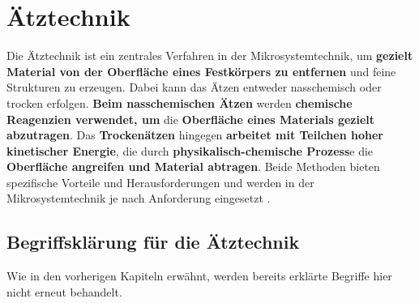 \documentclass{article} %
\begin{document}
\clearpage
\section{Ätztechnik}

Die Ätztechnik ist ein zentrales Verfahren in der Mikrosystemtechnik, um \textbf{gezielt Material von der Oberfläche eines Festkörpers zu entfernen} und feine Strukturen zu erzeugen. Dabei kann das Ätzen entweder nasschemisch oder trocken erfolgen. \textbf{Beim nasschemischen Ätzen} werden \textbf{chemische Reagenzien verwendet, um} die \textbf{Oberfläche eines Materials gezielt abzutragen}. Das \textbf{Trockenätzen} hingegen \textbf{arbeitet mit Teilchen hoher kinetischer Energie}, die durch \textbf{physikalisch-chemische Prozess}e die \textbf{Oberfläche angreifen und Material abtragen}. Beide Methoden bieten spezifische Vorteile und Herausforderungen und werden in der Mikrosystemtechnik je nach Anforderung eingesetzt \cite{schmid2024Aetzen}.





\vspace{1em}

\subsection{Begriffsklärung für die Ätztechnik}

Wie in den vorherigen Kapiteln erwähnt, werden bereits erklärte Begriffe hier nicht erneut behandelt.
\end{document}
